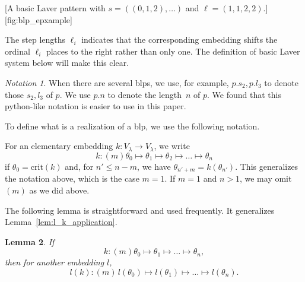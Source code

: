 \documentclass{article}
\newtheorem{lemma}{Lemma}[section]
\theoremstyle{definition}
\theoremstyle{remark}
\newtheorem{notation}[lemma]{Notation}
\begin{document}
[A basic Laver pattern with $s = ((0, 1, 2), \dots)$ and $\ell = (1, 1, 2, 2)$.][fig:blp_{ep}xample]

The step lengths $\ell_i$ indicates that the corresponding embedding shifts the ordinal $\ell_i$ places to the right rather than only one. The definition of basic Laver system below will make this clear.


\begin{notation} \label{notation:python_notation}
When there are several blps, we use, for example, $p.s_2, p.l_3$ to denote those $s_2,l_3$ of $p$. We use $p.n$ to denote the length~$n$ of $p$. We found that this python-like notation is easier to use in this paper.
\end{notation}
    


To define what is a realization of a blp, we use the following notation.

For an elementary embedding \( k : V_\lambda \to V_\lambda \), we write
\[
k : (m)\theta_0 \mapsto \theta_1 \mapsto \theta_2 \mapsto \dots \mapsto \theta_n
\]
if \(\theta_0 = \mathrm{crit}(k)\) and, for \(n' \le n-m\), we have \(\theta_{n'+m} = k(\theta_{n'})\). This generalizes the notation above, which is the case $m=1$. If \(m=1\) and \(n>1\), we may omit \((m)\) as we did above. 

The following lemma is straightforward and used frequently. It generalizes Lemma~\ref{lem:l_k_application}.

\begin{lemma} \label{lem:lk_application_general}
 If
  \[
k : (m)\theta_0 \mapsto \theta_1 \mapsto \dots \mapsto \theta_n,
\]
then for another embedding \(l\),
\[
l(k) : (m) \, l(\theta_0) \mapsto l(\theta_1) \mapsto \dots \mapsto l(\theta_n).
\]
\end{lemma}
\end{document}
